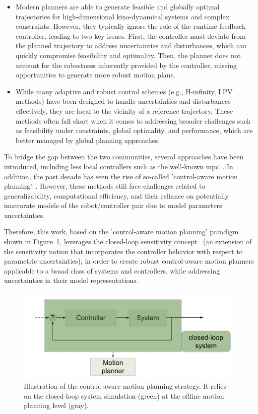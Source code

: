 \begin{itemize}
  \item Modern planners are able to generate feasible and globally optimal trajectories for high-dimensional kino-dynamical systems and complex constraints. 
  However, they typically ignore the role of the runtime feedback controller, leading to two key issues.
  First, the controller must deviate from the planned trajectory to address uncertainties and disturbances, which can quickly compromise feasibility and optimality.
  Then, the planner does not account for the robustness inherently provided by the controller, missing opportunities to generate more robust motion plans.
  \item While many adaptive and robust control schemes (e.g., H-infinity, LPV methods) have been designed to handle uncertainties and disturbances effectively, they are local to the vicinity of a reference trajectory. 
  These methods often fall short when it comes to addressing broader challenges such as feasibility under constraints, global optimality, and performance, which are better managed by global planning approaches.
\end{itemize}
    
To bridge the gap between the two communities, several approaches have been introduced, including less local controllers such as the well-known \gls{mpc}~\cite{cTMPC}. 
In addition, the past decade has seen the rise of so-called 'control-aware motion planning'~\cite{cTognon, cContractThMP, cMajundarLibrary}. 
However, these methods still face challenges related to generalizability, computational efficiency, and their reliance on potentially inaccurate models of the robot/controller pair due to model parameters uncertainties.

Therefore, this work, based on the 'control-aware motion planning' paradigm shown in Figure~\ref{fig:ca_strat}, leverages the closed-loop sensitivity concept~\cite{cPi,cTh} (an extension of the sensitivity notion that incorporates the controller behavior with respect to parametric uncertainties), in order to create robust control-aware motion planners applicable to a broad class of systems and controllers, while addressing uncertainties in their model representations.

\begin{figure} [htp]
    \centering
    \includegraphics[width=0.75\linewidth]{figures/intro/control-aware.png} 
    \caption{Illustration of the control-aware motion planning strategy.
    It relies on the closed-loop system simulation (green) at the offline motion planning level (gray).}%
    \label{fig:ca_strat}%
  \end{figure}

